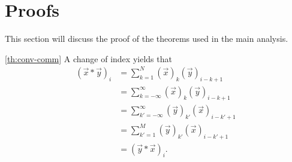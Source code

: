 \documentclass[a4paper, openany, oneside]{memoir}
\begin{document}
\section{Proofs}
\label{sec:proofs}
This section will discuss the proof of the theorems used in the main analysis.

\begin{blockProofTheorem}{\ref{th:conv-comm}}
    A change of index yields that
    \begin{align*}
        (\vec{x} \ast \vec{y})_i &= \sum_{k=1}^{N} (\vec{x})_k (\vec{y})_{i-k+1} \\
        &= \sum_{k=-\infty}^{\infty} (\vec{x})_k (\vec{y})_{i-k+1} \\
        &= \sum_{k'=-\infty}^{\infty} (\vec{y})_{k'} (\vec{x})_{i-k'+1} \\
        &= \sum_{k'=1}^{M} (\vec{y})_{k'} (\vec{x})_{i-k'+1} \\
        &= (\vec{y} \ast \vec{x})_i.
    \end{align*}
\end{blockProofTheorem}
\end{document}

